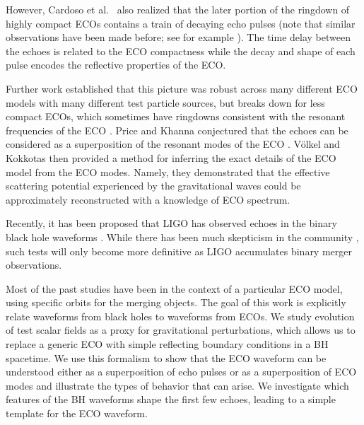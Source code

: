 \begin{refsection}
However, Cardoso et al.~\cite{Cardoso:2016rao} also realized that the later portion of the ringdown of highly compact ECOs contains a train of decaying echo pulses (note that similar observations have been made before; see for example  \cite{Kokkotas:1995av,PhysRevD.60.024004,Ferrari:2000sr}). 
The time delay between the echoes is related to the ECO compactness while the decay and shape of each pulse encodes the reflective properties of the ECO. 

Further work established that this picture was robust \cite{Barcelo:2017lnx} across many different ECO models with many different test particle sources, but breaks down for less compact ECOs, which sometimes have ringdowns consistent with the resonant frequencies of the ECO \cite{Cardoso:2016oxy,Price:2017cjr}.
Price and Khanna conjectured that the echoes can be considered as a superposition of the resonant modes of the ECO \cite{Price:2017cjr}. 
V\"{o}lkel and Kokkotas \cite{Volkel:2017kfj} then provided a method for inferring the exact details of the ECO model from the ECO modes. 
Namely, they demonstrated that the effective scattering potential experienced by the gravitational waves could be approximately reconstructed with a knowledge of ECO spectrum.

Recently, it has been proposed that LIGO has observed echoes in the binary black hole waveforms \cite{Abedi:2016hgu, Abedi:2017isz}. While there has been much skepticism in the community \cite{Ashton:2016xff}, such tests will only become more definitive as LIGO accumulates binary merger observations. 

Most of the past studies have been in the context of a particular ECO model, using specific orbits for the merging objects.
The goal of this work is explicitly relate waveforms from  black holes to waveforms from  ECOs.
We study evolution of test scalar fields as a proxy for gravitational perturbations, which allows us to replace a generic ECO with simple reflecting boundary conditions in a BH spacetime.
We use this formalism to show that the ECO waveform can be understood either as a superposition of echo pulses or as a superposition of ECO modes and illustrate the types of behavior that can arise. 
We investigate which features of the BH waveforms shape the first few echoes, leading to a simple template for the ECO waveform.


\end{refsection}
